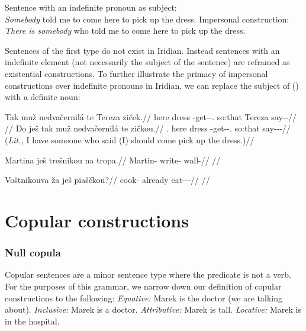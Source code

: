 \pex
\a  {}Sentence with an indefinite pronoun as subject:\\
    \emph{Somebody} told me to come here to pick up the dress.
\a  Impersonal construction:\\
    \emph{There is somebody} who told me to come here to pick up the dress.
\xe

Sentences of the first type do not exist in Iridian. Instead sentences with an
indefinite element (not necessarily the subject of the sentence) are reframed as
existential constructions. To further illustrate the primacy of impersonal
constructions over indefinite pronouns in Iridian, we can replace the subject of
() with a definite noun:

\pex
\a\begingl
    \gla Tak muž nedvačernilá te Tereza ziček.//
    \glb here dress \Caus{}-get-\Pv{}-\Subj{}.\Ipf{} so:that Tereza say-\Av{}-\Pf{}//
    \glft {}//
  \endgl
\a\begingl
    \gla Do ješ tak muž nedvačernilá te zičkou.//
    \glb \First{}\Sg{}.\Acc{} \Exst{} here dress \Caus{}-get-\Pv{}-\Subj{}.\Ipf{} so:that say-\Av{}-\Pf{}-\Nz{}//
    \glft {} (\emph{Lit.,} I have someone who said (I) should come pick up the dress.)//
  \endgl
\xe


\pex
\begingl
\gla Martina ješ trešnikou na tropa.//
\glb Martin-\Acc{} \Exst{} write- \Loc{} wall-\Acc{}//
\glft {}//
\endgl
\xe

\pex
\begingl
\gla Voštnikouva ža ješ piaščkou?//
\glb cook- already \Exst{} eat-\Av{}-\Pf{}-\Nz{}//
\glft {}//
\endgl
\xe

\section{Copular constructions}
\subsubsection{Null copula}

Copular sentences are a minor sentence type where the predicate is not a verb.
For the purposes of this grammar, we narrow down our definition of copular
constructions to the following:
\pex
\a \textit{Equative:} Marek is the doctor (we are talking about).
\a \textit{Inclusive:} Marek is a doctor.
\a \textit{Attributive:} Marek is tall.
\a \textit{Locative:} Marek is in the hospital.
\xe

